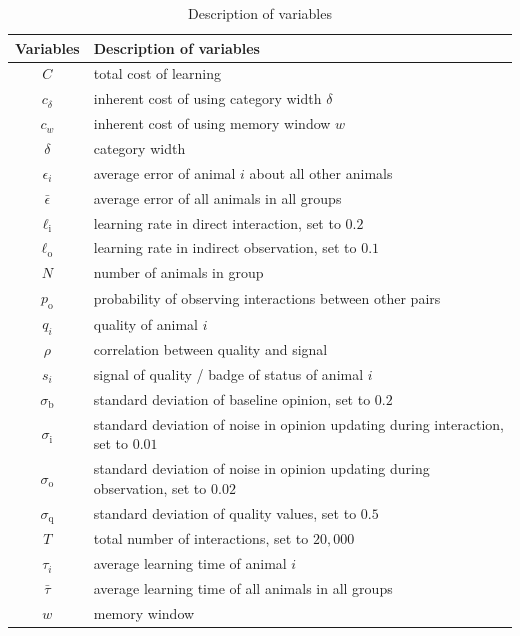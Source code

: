 %
\begin {table}[ht]
\caption {Description of variables} \label{tab:vars} 
\begin{tabular}{cl}

 Variables & Description of variables \\
\midrule 
$C$ & total cost of learning \\ 
$c_\delta$ & inherent cost of using category width $\delta$ \\ 
$c_w$ & inherent cost of using memory window $w$ \\
$\delta$ & category width \\
$\epsilon_i$ & average error of animal $i$ about all other animals \\
$\bar{\epsilon}$ & average error of all animals in all groups \\
$\ell_\text{i}$ & learning rate in direct interaction, set to $0.2$ \\
$\ell_\text{o}$ & learning rate in indirect observation, set to $0.1$ \\
$N$ & number of animals in group \\ 
$p_\text{o}$ & probability of observing interactions between other pairs \\
 $q_i$ & quality of animal $i$ \\ 
 $\rho$ & correlation between quality and signal \\
$s_i$ & signal of quality / badge of status of animal $i$ \\ 
$\sigma_\text{b}$ & standard deviation of baseline opinion, set to $0.2$ \\
$\sigma_\text{i}$ & standard deviation of noise in opinion updating during interaction, set to $0.01$ \\
$\sigma_\text{o}$ & standard deviation of noise in opinion updating during observation, set to $0.02$ \\
$\sigma_\text{q}$ & standard deviation of quality values, set to $0.5$ \\
$T$ & total number of interactions, set to $20,000$ \\
$\tau_i$ & average learning time of animal $i$ \\
$\bar{\tau}$ & average learning time of all animals in all groups \\ 
$w$ & memory window 
\end{tabular}
\end {table}

